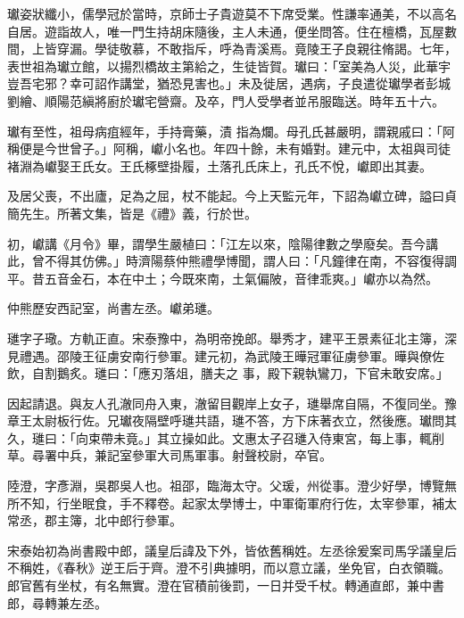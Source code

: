 \begin{pinyinscope}
 瓛姿狀纖小，儒學冠於當時，京師士子貴遊莫不下席受業。性謙率通美，不以高名自居。遊詣故人，唯一門生持胡床隨後，主人未通，便坐問答。住在檀橋，瓦屋數間，上皆穿漏。學徒敬慕，不敢指斥，呼為青溪焉。竟陵王子良親往脩謁。七年，表世祖為瓛立館，以揚烈橋故主第給之，生徒皆賀。瓛曰：「室美為人災，此華宇豈吾宅邪？幸可詔作講堂，猶恐見害也。」未及徙居，遇病，子良遣從瓛學者彭城劉繪、順陽范縝將廚於瓛宅營齋。及卒，門人受學者並吊服臨送。時年五十六。



 瓛有至性，祖母病疽經年，手持膏藥，漬
 指為爛。母孔氏甚嚴明，謂親戚曰：「阿稱便是今世曾子。」阿稱，巘小名也。年四十餘，未有婚對。建元中，太祖與司徒褚淵為巘娶王氏女。王氏椓壁掛履，土落孔氏床上，孔氏不悅，巘即出其妻。



 及居父喪，不出廬，足為之屈，杖不能起。今上天監元年，下詔為巘立碑，謚曰貞簡先生。所著文集，皆是《禮》義，行於世。



 初，巘講《月令》畢，謂學生嚴植曰：「江左以來，陰陽律數之學廢矣。吾今講此，曾不得其仿佛。」時濟陽蔡仲熊禮學博聞，謂人曰：「凡鐘律在南，不容復得調平。昔五音金石，本在中土；今既來南，土氣偏陂，音律乖爽。」巘亦以為然。



 仲熊歷安西記室，尚書左丞。巘弟璡。



 璡字子璥。方軌正直。宋泰豫中，為明帝挽郎。舉秀才，建平王景素征北主簿，深見禮遇。邵陵王征虜安南行參軍。建元初，為武陵王曄冠軍征虜參軍。曄與僚佐飲，自割鵝炙。璡曰：「應刃落俎，膳夫之
 事，殿下親執鸞刀，下官未敢安席。」



 因起請退。與友人孔澈同舟入東，澈留目觀岸上女子，璡舉席自隔，不復同坐。豫章王太尉板行佐。兄瓛夜隔壁呼璡共語，璡不答，方下床著衣立，然後應。瓛問其久，璡曰：「向束帶未竟。」其立操如此。文惠太子召璡入侍東宮，每上事，輒削草。尋署中兵，兼記室參軍大司馬軍事。射聲校尉，卒官。



 陸澄，字彥淵，吳郡吳人也。祖邵，臨海太守。父瑗，州從事。澄少好學，博覽無所不知，行坐眠食，手不釋卷。起家太學博士，中軍衛軍府行佐，太宰參軍，補太常丞，郡主簿，北中郎行參軍。



 宋泰始初為尚書殿中郎，議皇后諱及下外，皆依舊稱姓。左丞徐爰案司馬孚議皇后不稱姓，《春秋》逆王后于齊。澄不引典據明，而以意立議，坐免官，白衣領職。郎官舊有坐杖，有名無實。澄在官積前後罰，一日并受千杖。轉通直郎，兼中書郎，尋轉兼左丞。




\end{pinyinscope}
